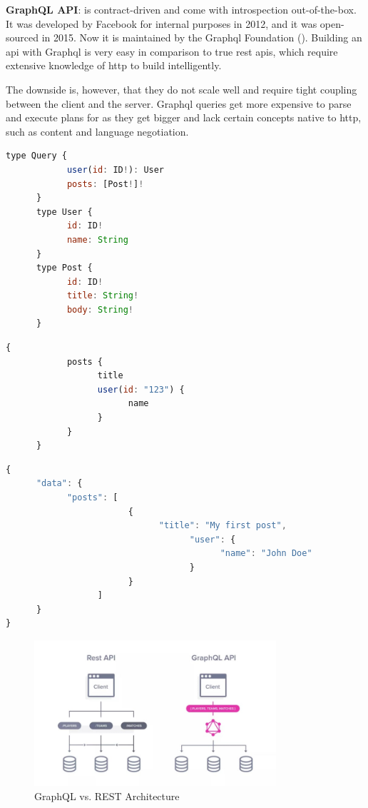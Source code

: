 \begin{multicols}{2}
      \textbf{GraphQL API}:
      is contract-driven and come with introspection out-of-the-box. It was developed by Facebook for internal purposes
      in 2012, and it was open-sourced in 2015. Now it is maintained by the Graph\acrshort{ql} Foundation (\cite{graphql}).
      Building an \acrshort{api} with Graph\acrshort{ql} is very easy in comparison to true \acrshort{rest} \acrshort{api}s,
      which require extensive knowledge of \acrshort{http} to build intelligently.

      The downside is, however, that they do not scale well and require tight coupling between the client and the
      server. Graph\acrshort{ql} queries get more expensive to parse and execute plans for as they get bigger and
      lack certain concepts native to \acrshort{http}, such as content and language negotiation.
\end{multicols}
\begin{lstlisting}[language=JavaScript, caption=GraphQL's Schema Example]
      type Query {
            user(id: ID!): User
            posts: [Post!]!
      }
      type User {
            id: ID!
            name: String
      }
      type Post {
            id: ID!
            title: String!
            body: String!
      }
\end{lstlisting}
\begin{lstlisting}[language=JavaScript, caption=GraphQL's Request Example to Specific Data]
      {
            posts {
                  title
                  user(id: "123") {
                        name
                  }
            }
      }
\end{lstlisting}
\begin{lstlisting}[language=JavaScript, caption=GraphQL's Return Data Example]
{
      "data": {
            "posts": [
                        {
                              "title": "My first post",
                                    "user": {
                                          "name": "John Doe"
                                    }
                        }
                  ]
      }
}            
\end{lstlisting}
\begin{figure}[htbp] %
      \centering
      \includegraphics[width=0.8\textwidth]{Figures/graphql.jpg}
      \caption{GraphQL vs. REST Architecture}
      \label{fig:graphqlvsrestarchitecture}
\end{figure}
